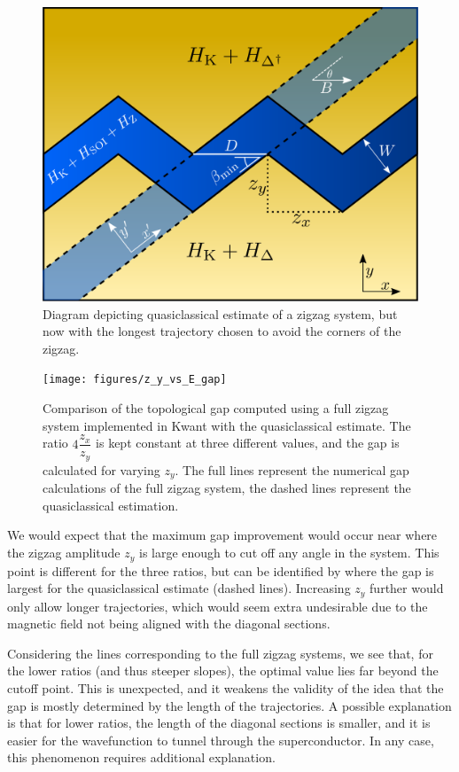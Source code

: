 			\begin{figure}
			\centering
			\includegraphics[width=0.45\columnwidth]{images/longest_trajectory_wo_corners}
			\caption{Diagram depicting quasiclassical estimate of a zigzag system, but now with the longest trajectory chosen to avoid the corners of the zigzag.}
			\label{fig:quasiclassical_approximation}
			\end{figure}

			\begin{figure}[!htb]
			\centering
			\texttt{[image: figures/z\_y\_vs\_E\_gap]}
			\caption{Comparison of the topological gap computed using a full zigzag system implemented in Kwant with the quasiclassical estimate. The ratio $4\dfrac{z_x}{z_y}$ is kept constant at three different values, and the gap is calculated for varying $z_y$.
			The full lines represent  the numerical gap calculations of the full zigzag system, the dashed lines represent the quasiclassical estimation.}
			\label{fig:quasiclassical_approximation}
			\end{figure}


			We would expect that the maximum gap improvement would occur near where the zigzag amplitude $z_y$ is large enough to cut off any angle in the system.
			This point is different for the three ratios, but can be identified by where the gap is largest for the quasiclassical estimate (dashed lines).
			Increasing $z_y$ further would only allow longer trajectories, which would seem extra undesirable due to the magnetic field not being aligned with the diagonal sections.
			
			Considering the lines corresponding to the full zigzag systems, we see that, for the lower ratios (and thus steeper slopes), the optimal value lies far beyond the cutoff point.
			This is unexpected, and it weakens the validity of the idea that the gap is mostly determined by the length of the trajectories.
			A possible explanation is that for lower ratios, the length of the diagonal sections is smaller, and  it is easier for the wavefunction to tunnel through the superconductor.
			In any case, this phenomenon requires additional explanation.

